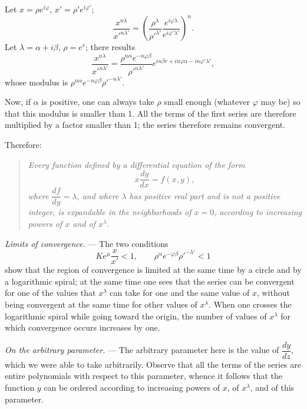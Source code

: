 \documentclass[11pt]{article}
\begin{document}
Let $x=\rho e^{i\varphi}$, $x'=\rho'e^{i\varphi'}$;
\[
\frac{x^{n\lambda}}{x'^{n\lambda'}}=\left(\frac{\rho^\lambda}{\rho'^{\lambda'}}\frac{e^{i\varphi\lambda}}{e^{i\varphi'\lambda'}}\right)^n.
\]
Let $\lambda=\alpha+i\beta$, $\rho=e^r$; there results
\[
\frac{x^{n\lambda}}{x'^{n\lambda'}}=\frac{\rho^{n\alpha}e^{-n\varphi\beta}}{\rho'^{n\lambda'}}e^{in\beta r+in\varphi\alpha-in\varphi'\lambda'},
\]
whose modulus is $\rho^{n\alpha}e^{-n\varphi\beta}\rho'^{-n\lambda'}$.

Now, if $\alpha$ is positive, one can always take $\rho$ small enough (whatever $\varphi$ may be) so that this modulus is smaller than 1. All the terms of the first series are therefore multiplied by a factor smaller than 1; the series therefore remains convergent.

Therefore:

\begin{quote}\itshape
Every function defined by a differential equation of the form
\[
x\frac{dy}{dx}=f(x,y),
\]
where $\dfrac{df}{dy}=\lambda$, and where $\lambda$ has positive real part and is not a positive integer, is expandable in the neighborhoods of $x=0$, according to increasing powers of $x$ and of $x^\lambda$.
\end{quote}

\emph{Limits of convergence.} — The two conditions
\[
Ke^\mu\frac{x}{x'}<1,
\qquad
\rho^\alpha e^{-\varphi\beta}\rho'^{-\lambda'}<1
\]
show that the region of convergence is limited at the same time by a circle and by a logarithmic spiral; at the same time one sees that the series can be convergent for one of the values that $x^\lambda$ can take for one and the same value of $x$, without being convergent at the same time for other values of $x^\lambda$. When one crosses the logarithmic spiral while going toward the origin, the number of values of $x^\lambda$ for which convergence occurs increases by one.

\emph{On the arbitrary parameter.} — The arbitrary parameter here is the value of $\dfrac{dy}{dz}$, which we were able to take arbitrarily. Observe that all the terms of the series are entire polynomials with respect to this parameter, whence it follows that the function $y$ can be ordered according to increasing powers of $x$, of $x^\lambda$, and of this parameter.
\end{document}
